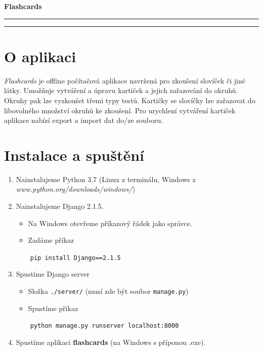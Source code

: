 \documentclass[12pt]{article}
\providecommand{\tightlist}{\setlength{\itemsep}{1pt}\setlength{\parskip}{1pt}}
\let\oldtexttt\texttt
\renewcommand{\texttt}[1]{\oldtexttt{\textcolor{codehighlight}{#1}}}
\begin{document}
\begin{center}
  \textbf{\Huge Flashcards}\\
  \vspace{0.2cm}
  \rule{\textwidth}{0.5pt}
\end{center}
\tableofcontents
\begin{center}
  \rule{\textwidth}{0.5pt}
\end{center}
\hypertarget{o-aplikaci}{%
\section{O aplikaci}\label{o-aplikaci}}

\emph{Flashcards} je offline počítačová aplikace navržená pro zkoušení
slovíček či jiné látky. Umožňuje vytváření a úpravu kartiček a jejich
zařazování do okruhů. Okruhy pak lze vyzkoušet třemi typy testů.
Kartičky se slovíčky lze zařazovat do libovolného množství okruhů ke
zkoušení. Pro urychlení vytváření kartiček aplikace nabízí export a
import dat do/ze souboru.

\hypertarget{instalace-a-spuux161tux11bnuxed}{%
\section{Instalace a spuštění}\label{instalace-a-spuux161tux11bnuxed}}

\begin{enumerate}
\def\labelenumi{\arabic{enumi}.}
\item
  Nainstalujeme Python 3.7 (Linux z terminálu, Windows z
  \emph{www.python.org/downloads/windows/})
\item
  Nainstalujeme Django 2.1.5.

  \begin{itemize}
  \tightlist
  \item
    Na Windows otevřeme příkazový řádek jako správce.
  \item
    Zadáme příkaz
  \end{itemize}

  ~~~~\texttt{pip\ install\ Django==2.1.5}
\item
  Spustíme Django server

  \begin{itemize}
  \tightlist
  \item
    Složka \texttt{./server/} (musí zde být soubor \texttt{manage.py})
  \item
    Spustíme příkaz
  \end{itemize}

  ~~~~\texttt{python\ manage.py\ runserver\ localhost:8000}
\item
  Spustíme aplikaci \textbf{flashcards} (na Windows s příponou .exe).
\end{enumerate}
\end{document}
